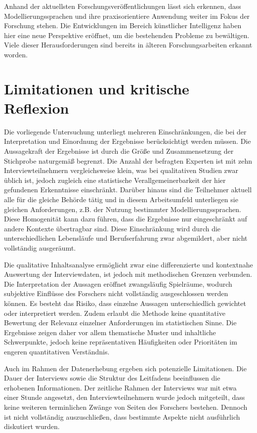 Anhand der aktuellsten Forschungsveröffentlichungen lässt sich erkennen, dass Modellierungssprachen und ihre praxisorientiere Anwendung weiter im Fokus der Forschung stehen. Die Entwicklungen im Bereich künstlicher Intelligenz haben hier eine neue Perspektive eröffnet, um die bestehenden Probleme zu bewältigen. Viele dieser Herausforderungen sind bereits in älteren Forschungsarbeiten erkannt worden. 



\section{Limitationen und kritische Reflexion}
Die vorliegende Untersuchung unterliegt mehreren Einschränkungen, die bei der Interpretation und Einordnung der Ergebnisse berücksichtigt werden müssen.
Die Aussagekraft der Ergebnisse ist durch die Größe und Zusammensetzung der Stichprobe naturgemäß begrenzt. Die Anzahl der befragten Experten ist mit zehn Interviewteilnehmern vergleichsweise klein, was bei qualitativen Studien zwar üblich ist, jedoch zugleich eine statistische Verallgemeinerbarkeit der hier gefundenen Erkenntnisse einschränkt. Darüber hinaus sind die Teilnehmer aktuell alle für die gleiche Behörde tätig und in diesem Arbeitsumfeld unterliegen sie gleichen Anforderungen, z.B. der Nutzung bestimmter Modellierungssprachen. Diese Homogenität kann dazu führen, dass die Ergebnisse nur eingeschränkt auf andere Kontexte übertragbar sind. Diese Einschränkung wird durch die unterschiedlichen Lebensläufe und Berufserfahrung zwar abgemildert, aber nicht vollständig ausgeräumt. 

Die qualitative Inhaltsanalyse ermöglicht zwar eine differenzierte und kontextnahe Auswertung der Interviewdaten, ist jedoch mit methodischen Grenzen verbunden. Die Interpretation der Aussagen eröffnet zwangsläufig Spielräume, wodurch subjektive Einflüsse des Forschers nicht vollständig ausgeschlossen werden können. Es besteht das Risiko, dass einzelne Aussagen unterschiedlich gewichtet oder interpretiert werden. Zudem erlaubt die Methode keine quantitative Bewertung der Relevanz einzelner Anforderungen im statistischen Sinne. Die Ergebnisse zeigen daher vor allem thematische Muster und inhaltliche Schwerpunkte, jedoch keine repräsentativen Häufigkeiten oder Prioritäten im engeren quantitativen Verständnis.

Auch im Rahmen der Datenerhebung ergeben sich potenzielle Limitationen. Die Dauer der Interviews sowie die Struktur des Leitfadens beeinflussen die erhobenen Informationen. Der zeitliche Rahmen der Interviews war mit etwa einer Stunde angesetzt, den Interviewteilnehmern wurde jedoch mitgeteilt, dass keine weiteren terminlichen Zwänge von Seiten des Forschers bestehen. Dennoch ist nicht vollständig auszuschließen, dass bestimmte Aspekte nicht ausführlich diskutiert wurden.

